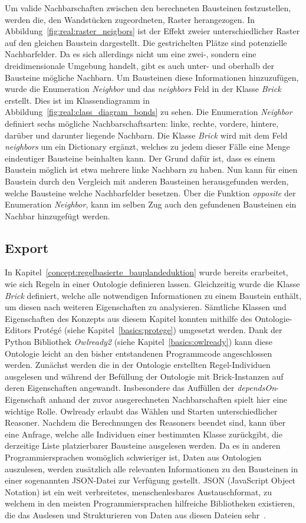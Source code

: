 Um valide Nachbarschaften zwischen den berechneten Bausteinen festzustellen, werden die, den Wandstücken zugeordneten, Raster herangezogen.
In Abbildung~\ref{fig:real:raster_neigbors} ist der Effekt zweier unterschiedlicher Raster auf den gleichen Baustein dargestellt.
Die gestrichelten Plätze sind potenzielle Nachbarfelder.
Da es sich allerdings nicht um eine zwei-, sondern eine dreidimensionale Umgebung handelt, gibt es auch unter- und oberhalb der Bausteine mögliche Nachbarn.
Um Bausteinen diese Informationen hinzuzufügen, wurde die Enumeration \textit{Neighbor} und das \textit{neighbors} Feld in der Klasse \textit{Brick} erstellt.
Dies ist im Klassendiagramm in Abbildung~\ref{fig:real:class_diagram_bonds} zu sehen.
Die Enumeration \textit{Neighbor} definiert sechs mögliche Nachbarschaftsarten: linke, rechte, vordere, hintere, darüber und darunter liegende Nachbarn.
Die Klasse \textit{Brick} wird mit dem Feld \textit{neighbors} um ein Dictionary ergänzt, welches zu jedem dieser Fälle eine Menge eindeutiger Bausteine beinhalten kann.
Der Grund dafür ist, dass es einem Baustein möglich ist etwa mehrere linke Nachbarn zu haben.
Nun kann für einen Baustein durch den Vergleich mit anderen Bausteinen herausgefunden werden, welche Bausteine welche Nachbarfelder besetzen.
Über die Funktion \textit{opposite} der Enumeration \textit{Neighbor}, kann im selben Zug auch den gefundenen Bausteinen ein Nachbar hinzugefügt werden.


\subsection{Export}\label{real:export}
In Kapitel~\ref{concept:regelbasierte_bauplandeduktion} wurde bereits erarbeitet, wie sich Regeln in einer Ontologie definieren lassen.
Gleichzeitig wurde die Klasse \textit{Brick} definiert, welche alle notwendigen Informationen zu einem Baustein enthält, um diesen nach weiteren Eigenschaften zu analysieren.
Sämtliche Klassen und Eigenschaften des Konzepts aus diesem Kapitel konnten mithilfe des Ontologie-Editors Protégé (siehe Kapitel~\ref{basics:protege}) umgesetzt werden.
Dank der Python Bibliothek \textit{Owlready2} (siehe Kapitel~\ref{basics:owlready}) kann diese Ontologie leicht an den bisher entstandenen Programmcode angeschlossen werden.
Zunächst werden die in der Ontologie erstellten Regel-Individuen ausgelesen und während der Befüllung der Ontologie mit Brick-Instanzen auf deren Eigenschaften angewandt.
Insbesondere das Auffüllen der \textit{dependsOn}-Eigenschaft anhand der zuvor ausgerechneten Nachbarschaften spielt hier eine wichtige Rolle.
Owlready erlaubt das Wählen und Starten unterschiedlicher Reasoner.
Nachdem die Berechnungen des Reasoners beendet sind, kann über eine Anfrage, welche alle Individuen einer bestimmten Klasse zurückgibt, die derzeitige Liste platzierbarer Bausteine ausgelesen werden.
Da es in anderen Programmiersprachen womöglich schwieriger ist, Daten aus Ontologien auszulesen, werden zusätzlich alle relevanten Informationen zu den Bausteinen in einer sogenannten JSON-Datei zur Verfügung gestellt.
JSON (JavaScript Object Notation) ist ein weit verbreitetes, menschenlesbares Austauschformat, zu welchem in den meisten Programmiersprachen hilfreiche Bibliotheken existieren, die das Auslesen und Strukturieren von Daten aus diesen Dateien sehr~\cite{json}.
